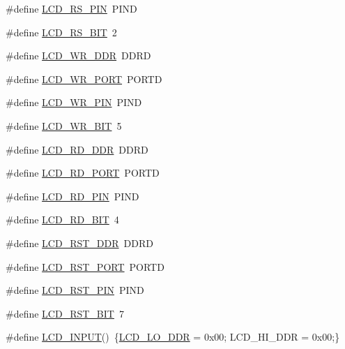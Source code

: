 \begin{DoxyCompactItemize}
\item 
\#define \hyperlink{group___s_s_d1289_gae5c0a0a5750f3aaea06083e3a4a31f5d}{L\+C\+D\+\_\+\+R\+S\+\_\+\+P\+I\+N}~P\+I\+N\+D
\item 
\#define \hyperlink{group___s_s_d1289_ga3ee95e3ef0c627f4e703afeb1dac335a}{L\+C\+D\+\_\+\+R\+S\+\_\+\+B\+I\+T}~2
\item 
\#define \hyperlink{group___s_s_d1289_ga218b58fc651c7a4baa3fc4b8616f32fb}{L\+C\+D\+\_\+\+W\+R\+\_\+\+D\+D\+R}~D\+D\+R\+D
\item 
\#define \hyperlink{group___s_s_d1289_ga815c38dc74dd91415221223106b0c75b}{L\+C\+D\+\_\+\+W\+R\+\_\+\+P\+O\+R\+T}~P\+O\+R\+T\+D
\item 
\#define \hyperlink{group___s_s_d1289_ga95df3990665313c6ab285ee184270f04}{L\+C\+D\+\_\+\+W\+R\+\_\+\+P\+I\+N}~P\+I\+N\+D
\item 
\#define \hyperlink{group___s_s_d1289_ga9b4501fa334eb3368916fdf8ad26aec1}{L\+C\+D\+\_\+\+W\+R\+\_\+\+B\+I\+T}~5
\item 
\#define \hyperlink{group___s_s_d1289_gad2d482e3917e61ac84e263f6fabfad58}{L\+C\+D\+\_\+\+R\+D\+\_\+\+D\+D\+R}~D\+D\+R\+D
\item 
\#define \hyperlink{group___s_s_d1289_ga34dbbb92d6226e04c2b81615709ace33}{L\+C\+D\+\_\+\+R\+D\+\_\+\+P\+O\+R\+T}~P\+O\+R\+T\+D
\item 
\#define \hyperlink{group___s_s_d1289_ga19698c29b41af49b15662e9234b2c78f}{L\+C\+D\+\_\+\+R\+D\+\_\+\+P\+I\+N}~P\+I\+N\+D
\item 
\#define \hyperlink{group___s_s_d1289_gabeb8982482e0266522a002535b45b216}{L\+C\+D\+\_\+\+R\+D\+\_\+\+B\+I\+T}~4
\item 
\#define \hyperlink{group___s_s_d1289_ga0f7a99ea60ac1d8642f3d7405c499319}{L\+C\+D\+\_\+\+R\+S\+T\+\_\+\+D\+D\+R}~D\+D\+R\+D
\item 
\#define \hyperlink{group___s_s_d1289_ga774d1462751965473d6cc3a4ec270336}{L\+C\+D\+\_\+\+R\+S\+T\+\_\+\+P\+O\+R\+T}~P\+O\+R\+T\+D
\item 
\#define \hyperlink{group___s_s_d1289_ga9d11073f149e02e0a07937196d1e5a8e}{L\+C\+D\+\_\+\+R\+S\+T\+\_\+\+P\+I\+N}~P\+I\+N\+D
\item 
\#define \hyperlink{group___s_s_d1289_ga0b949f40b416bd3c38804ac8314516b5}{L\+C\+D\+\_\+\+R\+S\+T\+\_\+\+B\+I\+T}~7
\item 
\#define \hyperlink{group___s_s_d1289_ga01e38a7f21c96c374fb3504d78196b9b}{L\+C\+D\+\_\+\+I\+N\+P\+U\+T}()~\{\hyperlink{group___s_s_d1289_ga80fe94799cc97d53850ad19fbc65040c}{L\+C\+D\+\_\+\+L\+O\+\_\+\+D\+D\+R} = 0x00; L\+C\+D\+\_\+\+H\+I\+\_\+\+D\+D\+R = 0x00;\}

\end{DoxyCompactItemize}
